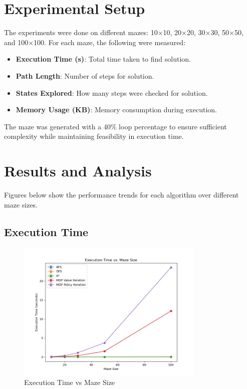 \documentclass{article}
\begin{document}
\section{Experimental Setup}
The experiments were done on different mazes: 10×10, 20×20, 30×30, 50×50, and 100×100. For each maze, the following were measured:
\begin{itemize}
    \item \textbf{Execution Time (s)}: Total time taken to find solution.
    \item \textbf{Path Length}: Number of steps for solution.
    \item \textbf{States Explored}: How many steps were checked for solution.
    \item \textbf{Memory Usage (KB)}: Memory consumption during execution.
\end{itemize}
The maze was generated with a 40\% loop percentage to ensure sufficient complexity while maintaining feasibility in execution time.

\section{Results and Analysis}
Figures below show the performance trends for each algorithm over different maze sizes.

\subsection{Execution Time}
\begin{figure}[h]
    \centering
    \includegraphics[width=0.8\textwidth]{analysis_plots/execution_time.png}
    \caption{Execution Time vs Maze Size}
\end{figure}
\end{document}
